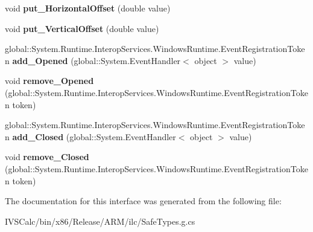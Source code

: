 \begin{DoxyCompactItemize}
void {\bfseries put\+\_\+\+Horizontal\+Offset} (double value)
\item 
\mbox{\label{interface_windows_1_1_u_i_1_1_xaml_1_1_controls_1_1_primitives_1_1_i_popup_a32f8e439f47db97069a953e214b6ca34}} 
void {\bfseries put\+\_\+\+Vertical\+Offset} (double value)
\item 
\mbox{\label{interface_windows_1_1_u_i_1_1_xaml_1_1_controls_1_1_primitives_1_1_i_popup_ab7ef34f049e0e256cb8967e69a9b98d7}} 
global\+::\+System.\+Runtime.\+Interop\+Services.\+Windows\+Runtime.\+Event\+Registration\+Token {\bfseries add\+\_\+\+Opened} (global\+::\+System.\+Event\+Handler$<$ object $>$ value)
\item 
\mbox{\label{interface_windows_1_1_u_i_1_1_xaml_1_1_controls_1_1_primitives_1_1_i_popup_a74799a81cbc767152e6840378638c41e}} 
void {\bfseries remove\+\_\+\+Opened} (global\+::\+System.\+Runtime.\+Interop\+Services.\+Windows\+Runtime.\+Event\+Registration\+Token token)
\item 
\mbox{\label{interface_windows_1_1_u_i_1_1_xaml_1_1_controls_1_1_primitives_1_1_i_popup_a9ad51ec03f9494cd9cd44d9aca1e407e}} 
global\+::\+System.\+Runtime.\+Interop\+Services.\+Windows\+Runtime.\+Event\+Registration\+Token {\bfseries add\+\_\+\+Closed} (global\+::\+System.\+Event\+Handler$<$ object $>$ value)
\item 
\mbox{\label{interface_windows_1_1_u_i_1_1_xaml_1_1_controls_1_1_primitives_1_1_i_popup_a737cc2cd2691f9cd97ecc0521717a7e8}} 
void {\bfseries remove\+\_\+\+Closed} (global\+::\+System.\+Runtime.\+Interop\+Services.\+Windows\+Runtime.\+Event\+Registration\+Token token)
\end{DoxyCompactItemize}


The documentation for this interface was generated from the following file\+:\begin{DoxyCompactItemize}
\item 
I\+V\+S\+Calc/bin/x86/\+Release/\+A\+R\+M/ilc/Safe\+Types.\+g.\+cs\end{DoxyCompactItemize}

